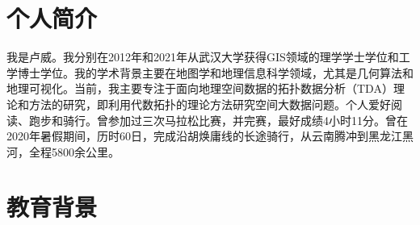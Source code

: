 \documentclass{resume}
\begin{document}


 
\section{个人简介}
我是卢威。我分别在2012年和2021年从武汉大学获得GIS领域的理学学士学位和工学博士学位。我的学术背景主要在地图学和地理信息科学领域，尤其是几何算法和地理可视化。当前，我主要专注于面向地理空间数据的拓扑数据分析（TDA）理论和方法的研究，即利用代数拓扑的理论方法研究空间大数据问题。个人爱好阅读、跑步和骑行。曾参加过三次马拉松比赛，并完赛，最好成绩4小时11分。曾在2020年暑假期间，历时60日，完成沿胡焕庸线的长途骑行，从云南腾冲到黑龙江黑河，全程5800余公里。

\section{教育背景}
\end{document}
